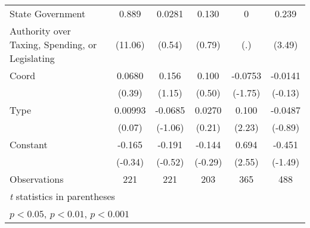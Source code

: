 {\begin{tabular}{l*{5}{c}}
\addlinespace
State Government&    0.889\sym{***}&   0.0281         &    0.130         &        0         &    0.239\sym{**} \\
Authority over Taxing, Spending, or Legislating&  (11.06)         &   (0.54)         &   (0.79)         &      (.)         &   (3.49)         \\
\addlinespace
Coord           &   0.0680         &    0.156         &    0.100         &  -0.0753         &  -0.0141         \\
                &   (0.39)         &   (1.15)         &   (0.50)         &  (-1.75)         &  (-0.13)         \\
\addlinespace
Type            &  0.00993         &  -0.0685         &   0.0270         &    0.100\sym{*}  &  -0.0487         \\
                &   (0.07)         &  (-1.06)         &   (0.21)         &   (2.23)         &  (-0.89)         \\
\addlinespace
Constant        &   -0.165         &   -0.191         &   -0.144         &    0.694\sym{*}  &   -0.451         \\
                &  (-0.34)         &  (-0.52)         &  (-0.29)         &   (2.55)         &  (-1.49)         \\
\midrule
Observations    &      221         &      221         &      203         &      365         &      488         \\
\bottomrule
\multicolumn{6}{l}{\footnotesize \textit{t} statistics in parentheses}\\
\multicolumn{6}{l}{\footnotesize \sym{*} \(p<0.05\), \sym{**} \(p<0.01\), \sym{***} \(p<0.001\)}\\
\end{tabular}
}
